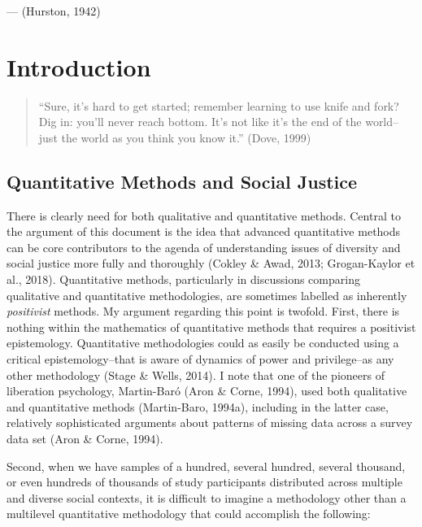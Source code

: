 \documentclass[
  letterpaper,
  DIV=11,
  numbers=noendperiod]{scrreprt}
\begin{document}
--- (Hurston, 1942)


\hypertarget{introduction}{%
\chapter{Introduction}\label{introduction}}

\begin{quote}
``Sure, it's hard to get started; remember learning to use knife and
fork? Dig in: you'll never reach bottom. It's not like it's the end of
the world--just the world as you think you know it.'' (Dove, 1999)
\end{quote}

\hypertarget{quantitative-methods-and-social-justice}{%
\section{Quantitative Methods and Social
Justice}\label{quantitative-methods-and-social-justice}}

There is clearly need for both qualitative and quantitative methods.
Central to the argument of this document is the idea that advanced
quantitative methods can be core contributors to the agenda of
understanding issues of diversity and social justice more fully and
thoroughly (Cokley \& Awad, 2013; Grogan-Kaylor et al., 2018).
Quantitative methods, particularly in discussions comparing qualitative
and quantitative methodologies, are sometimes labelled as inherently
\emph{positivist} methods. My argument regarding this point is twofold.
First, there is nothing within the mathematics of quantitative methods
that requires a positivist epistemology. Quantitative methodologies
could as easily be conducted using a critical epistemology--that is
aware of dynamics of power and privilege--as any other methodology
(Stage \& Wells, 2014). I note that one of the pioneers of liberation
psychology, Martin-Baró (Aron \& Corne, 1994), used both qualitative and
quantitative methods (Martin-Baro, 1994a), including in the latter case,
relatively sophisticated arguments about patterns of missing data across
a survey data set (Aron \& Corne, 1994).

Second, when we have samples of a hundred, several hundred, several
thousand, or even hundreds of thousands of study participants
distributed across multiple and diverse social contexts, it is difficult
to imagine a methodology other than a multilevel quantitative
methodology that could accomplish the following:
\end{document}
